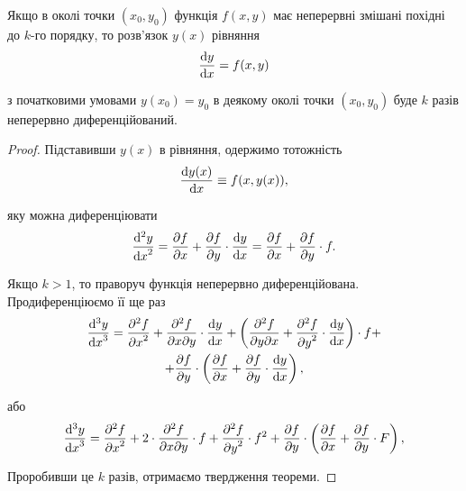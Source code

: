 \begin{theorem}
	Якщо в околі точки $(x_0,y_0)$ функція $f(x,y)$ має неперервні змішані похідні до $k$-го порядку, то розв'язок $y(x)$ рівняння
	\begin{equation*}
		\frac{\mathop{}\!\mathrm{d} y}{\mathop{}\!\mathrm{d} x} = f(x, y)
	\end{equation*}

	з початковими умовами $y(x_0)=y_0$ в деякому околі точки $(x_0,y_0)$ буде $k$ разів неперервно диференційований.
\end{theorem}

\begin{proof} 
	Підставивши $y(x)$ в рівняння, одержимо тотожність
	\begin{equation*}
		\frac{\mathop{}\!\mathrm{d} y(x)}{\mathop{}\!\mathrm{d} x} \equiv f(x, y(x)),
	\end{equation*}

	яку можна диференціювати
	\begin{equation*}
		\frac{\mathop{}\!\mathrm{d}^2 y}{{\mathop{}\!\mathrm{d} x}^2} = \frac{\partial f}{\partial x} + \frac{\partial f}{\partial y} \cdot \frac{\mathop{}\!\mathrm{d} y}{\mathop{}\!\mathrm{d} x} = \frac{\partial f}{\partial x} + \frac{\partial f}{\partial y} \cdot f.
	\end{equation*}

	Якщо $k > 1$, то праворуч функція неперервно диференційована. Продиференціюємо її ще раз
	\begin{multline*}
		\frac{\diff^3 y}{{\diff x}^3} = \frac{\partial^2 f}{{\partial x}^2} + \frac{\partial^2 f}{\partial x \partial y} \cdot \frac{\diff y}{\diff x} + \left( \frac{\partial^2 f}{\partial y \partial x} + \frac{\partial^2 f}{{\partial y}^2} \cdot \frac{\diff y}{\diff x} \right) \cdot f + \\
		+ \frac{\partial f}{\partial y} \cdot \left( \frac{\partial f}{\partial x} + \frac{\partial f}{\partial y} \cdot \frac{\diff y}{\diff x} \right),
	\end{multline*}

	або
	\begin{equation*}
		\frac{\mathop{}\!\mathrm{d}^3 y}{{\mathop{}\!\mathrm{d} x}^3} = \frac{\partial^2 f}{{\partial x}^2} + 2 \cdot \frac{\partial^2 f}{\partial x \partial y} \cdot f + \frac{\partial^2 f}{{\partial y}^2} \cdot f^2 + \frac{\partial f}{\partial y} \cdot \left( \frac{\partial f}{\partial x} + \frac{\partial f}{\partial y} \cdot F \right),
	\end{equation*}

	Проробивши це $k$ разів, отримаємо твердження теореми.
\end{proof}


